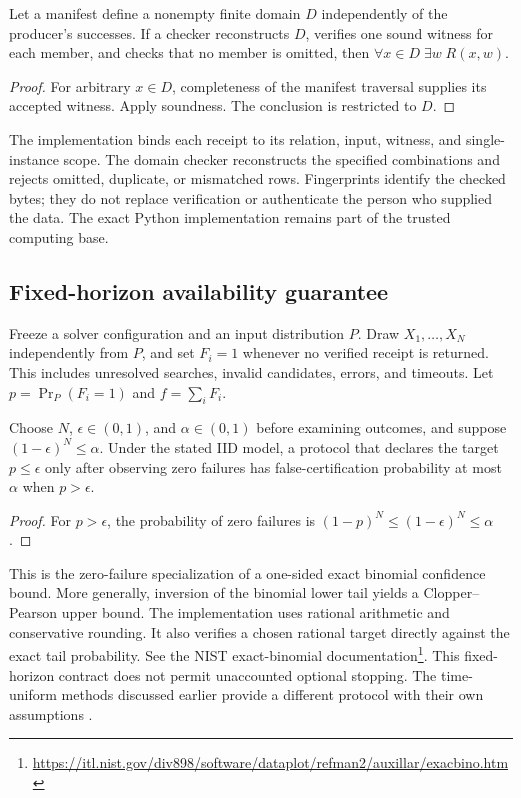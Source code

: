 \begin{theorem}\label{thm:finite-contract}
Let a manifest define a nonempty finite domain $D$ independently of the
producer's successes. If a checker reconstructs $D$, verifies one sound
witness for each member, and checks that no member is omitted, then
$\forall x\in D\;\exists w\;R(x,w)$.
\end{theorem}
\begin{proof}
For arbitrary $x\in D$, completeness of the manifest traversal supplies its
accepted witness. Apply soundness. The conclusion is restricted to $D$.
\end{proof}

The implementation binds each receipt to its relation, input, witness, and
single-instance scope. The domain checker reconstructs the specified
combinations and rejects omitted, duplicate, or mismatched rows. Fingerprints
identify the checked bytes; they do not replace verification or authenticate
the person who supplied the data. The exact Python implementation remains
part of the trusted computing base.

\subsection{Fixed-horizon availability guarantee}

Freeze a solver configuration and an input distribution $P$. Draw
$X_1,\ldots,X_N$ independently from $P$, and set $F_i=1$ whenever no verified
receipt is returned. This includes unresolved searches, invalid candidates,
errors, and timeouts. Let $p=\Pr_P(F_i=1)$ and $f=\sum_iF_i$.

\begin{proposition}\label{prop:reliability}
Choose $N$, $\epsilon\in(0,1)$, and $\alpha\in(0,1)$ before examining outcomes,
and suppose $(1-\epsilon)^N\le\alpha$. Under the stated IID model, a protocol
that declares the target $p\le\epsilon$ only after observing zero failures has
false-certification probability at most $\alpha$ when $p>\epsilon$.
\end{proposition}
\begin{proof}
For $p>\epsilon$, the probability of zero failures is
$(1-p)^N\le(1-\epsilon)^N\le\alpha$.
\end{proof}

This is the zero-failure specialization of a one-sided exact binomial
confidence bound. More generally, inversion of the binomial lower tail yields
a Clopper--Pearson upper bound. The implementation uses rational arithmetic
and conservative rounding. It also verifies a chosen rational target directly
against the exact tail probability. See the NIST exact-binomial
documentation\footnote{\url{https://itl.nist.gov/div898/software/dataplot/refman2/auxillar/exacbino.htm}}.
This fixed-horizon contract does not permit unaccounted optional stopping.
The time-uniform methods discussed earlier provide a different protocol with
their own assumptions \cite{HowardEtAl2021}.


